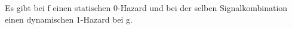 \documentclass{CInf_practice}
\begin{document}

Es gibt bei f einen statischen 0-Hazard und bei der selben Signalkombination
einen dynamischen 1-Hazard bei g.
\end{document}
